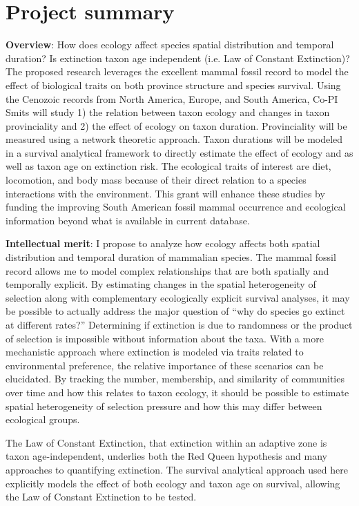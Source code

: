 \documentclass[11pt,letterpaper]{article}
\begin{document}
\setcounter{secnumdepth}{0}
\section{Project summary}

\textbf{Overview}:
How does ecology affect species spatial distribution and temporal duration? Is extinction taxon age independent (i.e. Law of Constant Extinction)? The proposed research leverages the excellent mammal fossil record to model the effect of biological traits on both province structure and species survival. Using the Cenozoic records from North America, Europe, and South America, Co-PI Smits will study 1) the relation between taxon ecology and changes in taxon provinciality and 2) the effect of ecology on taxon duration. Provinciality will be measured using a network theoretic approach. Taxon durations will be modeled in a survival analytical framework to directly estimate the effect of ecology and as well as taxon age on extinction risk. The ecological traits of interest are diet, locomotion, and body mass because of their direct relation to a species interactions with the environment. This grant will enhance these studies by funding the improving South American fossil mammal occurrence and ecological information beyond what is available in current database.

\textbf{Intellectual merit}:
I propose to analyze how ecology affects both spatial distribution and temporal duration of mammalian species. The mammal fossil record allows me to model complex relationships that are both spatially and temporally explicit. By estimating changes in the spatial heterogeneity of selection along with complementary ecologically explicit survival analyses, it may be possible to actually address the major question of ``why do species go extinct at different rates?'' 
Determining if extinction is due to randomness or the product of selection is impossible without information about the taxa. With a more mechanistic approach where extinction is modeled via traits related to environmental preference, the relative importance of these scenarios can be elucidated. By tracking the number, membership, and similarity of communities over time and how this relates to taxon ecology, it should be possible to estimate spatial heterogeneity of selection pressure and how this may differ between ecological groups.

The Law of Constant Extinction, that extinction within an adaptive zone is taxon age-independent, underlies both the Red Queen hypothesis and many approaches to quantifying extinction. The survival analytical approach used here explicitly models the effect of both ecology and taxon age on survival, allowing the Law of Constant Extinction to be tested.
\end{document}
